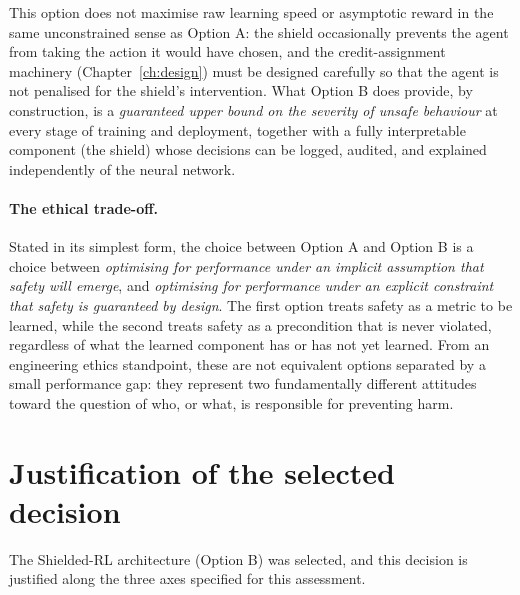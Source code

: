 This option does not maximise raw learning speed or asymptotic reward in the same
unconstrained sense as Option A: the shield occasionally prevents the agent from taking
the action it would have chosen, and the credit-assignment machinery
(Chapter~\ref{ch:design}) must be designed carefully so that the agent is not
penalised for the shield's intervention. What Option B does provide, by construction, is
a \textit{guaranteed upper bound on the severity of unsafe behaviour} at every stage of
training and deployment, together with a fully interpretable component (the shield) whose
decisions can be logged, audited, and explained independently of the neural network.

\paragraph{The ethical trade-off.}
Stated in its simplest form, the choice between Option A and Option B is a choice between
\textit{optimising for performance under an implicit assumption that safety will emerge},
and \textit{optimising for performance under an explicit constraint that safety is
guaranteed by design}. The first option treats safety as a metric to be learned, while
the second treats safety as a precondition that is never violated, regardless of what the
learned component has or has not yet learned. From an engineering ethics standpoint,
these are not equivalent options separated by a small performance gap: they represent
two fundamentally different attitudes toward the question of who, or what, is responsible
for preventing harm.

\section{Justification of the selected decision}\label{sec:ethics-justification}

The Shielded-RL architecture (Option B) was selected, and this decision is justified
along the three axes specified for this assessment.

